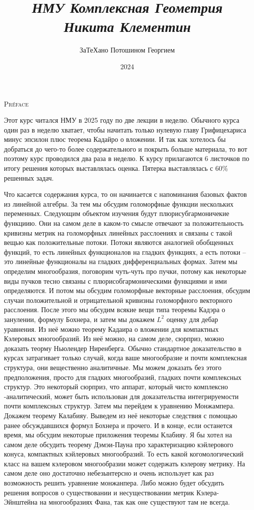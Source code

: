\documentclass[a4paper, 12pt, oneside]{book}
\title{
\textit{\huge{НМУ Комплексная Геометрия\\Никита Клементин}}
}
\date{2024}
\author{\small{ЗаТеХано Потошином Георгием}}
\begin{document}
\maketitle

\begin{center}\textsc{\Large{Préface}}\end{center}

Этот курс читался НМУ в 2025 году по две лекции в неделю. Обычного курса один раз
в неделю хватает, чтобы начитать только нулевую главу Грифицехариса минус эпсилон
плюс теорема Кадайро о вложении. И так как хотелось бы добраться до чего-то более
содержательного и покрыть больше материала, то вот поэтому курс проводился два
раза в неделю. К курсу прилагаются 6 листочков по итогу решения которых выставлялась
оценка. Пятерка выставлялась с 60\% решенных задач. 

Что касается содержания курса, то он начинается с напоминания базовых фактов из
линейной алгебры. За тем мы обсудим голоморфные функции нескольких переменных.
Следующим объектом изучения будут плюрисубгармоничекие функциию. Они на самом
деле в каком-то смысле отвечают за положительность кривизны метрик на голоморфных
линейных расслоениях и связаны с такой вещью как положительные потоки. Потоки
являются аналогией обобщенных функций, то есть линейных функционалов на гладких
функциях, а есть потоки – это линейные функционалы на гладких дифференциальных
формах. Затем мы определим многообразия, поговорим чуть-чуть про пучки, потому
как некоторые виды пучков тесно связаны с плюрисобгармоническими функциями и ими
определяются. И потом мы обсудим голоморфные векторные расслоения, обсудим
случаи положительной и отрицательной кривизны голоморфного векторного расслоения.
После этого мы обсудим всякие вещи типа теоремы Кадэра о занулении, формулу
Бохнера, и затем мы докажем $L^2$ оценку для дебар уравнения. Из неё можно
теорему Кадаира о вложении для компактных Кэлеровых многообразий. Из неё можно,
на самом деле, сюрприз, можно доказать теорму Ньюлендер Ниренберга. Обычно 
стандартное доказательство в курсах затрагивает только случай, когда ваше
многообразие и почти комплексная структура, они вещественно аналитичные. Мы можем
доказать без этого предположения, просто для гладких многообразий, гладких почти
комплексных структур. Это некоторый сюрприз, что аппарат, который чисто комплексно
-аналитический, может быть использован для доказательства интегрируемости почти
комплексных структур. Затем мы перейдем к уравнению Монжампера. Докажем теорему
Калабияу. Выведем из неё некоторые следствия с помощью ранее обсуждавшихся формул
Бохнера и прочего. И в конце, если останется время, мы обсудим некоторые приложения
теоремы Клабияу. Я бы хотел на самом деле обсудить теорему Дэмэи-Пауна про
характеризацию кэйлерового конуса, компактных кэйлеровых многообразий. То есть
какой когомологический класс на вашем кэлеровом многообразии может содержать
кэлерову метрику. На самом деле оно достаточно небезынтерсно и очень использует
как раз возможность решить уравнение монжанпера. Либо можно будет обсудить решения
вопросов о существовании и несуществовании метрик Кэлера-Эйнштейна на многообразиях
Фана, так как оне существуют там не всегда.
\end{document}
